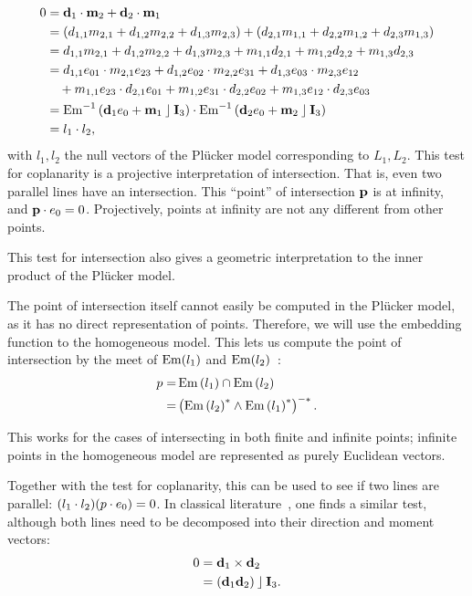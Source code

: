 \begin{align}
  \label{eq:coplanar}
  0 &= \mathbf{d}_1 \mathbin{\cdot} \mathbf{m}_2 + \mathbf{d}_2 \mathbin{\cdot} \mathbf{m}_1 \nonumber \\
    &= \left( d_{1,1} m_{2,1} + d_{1,2} m_{2,2} + d_{1,3} m_{2,3} \right) + \left( d_{2,1} m_{1,1} + d_{2,2} m_{1,2} + d_{2,3} m_{1,3} \right) \nonumber \\
    &= d_{1,1} m_{2,1} + d_{1,2} m_{2,2} + d_{1,3} m_{2,3} + m_{1,1} d_{2,1} + m_{1,2} d_{2,2} + m_{1,3} d_{2,3} \nonumber \\
    &= d_{1,1} e_{01} \mathbin{\cdot} m_{2,1} e_{23} + d_{1,2} e_{02} \mathbin{\cdot} m_{2,2} e_{31} + d_{1,3} e_{03} \mathbin{\cdot} m_{2,3} e_{12} \nonumber \\
    &\quad + m_{1,1} e_{23} \mathbin{\cdot} d_{2,1} e_{01} + m_{1,2} e_{31} \mathbin{\cdot} d_{2,2} e_{02} + m_{1,3} e_{12} \mathbin{\cdot} d_{2,3} e_{03} \nonumber \\
    &= \operatorname{Em}^{-1}\left( \mathbf{d}_1e_0 + \mathbf{m}_1 \mathbin{\rfloor} \mathbf{I}_3 \right) \mathbin{\cdot} \operatorname{Em}^{-1}\left( \mathbf{d}_2e_0 + \mathbf{m}_2 \mathbin{\rfloor} \mathbf{I}_3 \right) \nonumber \\
    &= l_1 \mathbin{\cdot} l_2,
\end{align}
with $l_1, l_2$ the null vectors of the Pl\"ucker model corresponding to $L_1, L_2$.  This test for coplanarity is a projective interpretation of intersection.  That is, even two parallel lines have an intersection.  This ``point'' of intersection $\mathbf{p}$ is at infinity, and $\mathbf{p} \mathbin{\cdot} e_0 = 0$.  Projectively, points at infinity are not any different from other points.

  This test for intersection also gives a geometric interpretation to the inner product of the Pl\"ucker model.

The point of intersection itself cannot easily be computed in the Pl\"ucker model, as it has no direct representation of points.  Therefore, we will use the embedding function to the homogeneous model.  This lets us compute the point of intersection by the meet of $\operatorname{Em}(l_1)$ and $\operatorname{Em}(l_2)$~\cite[Section 11.7.1]{TheBook}:
\begin{align}
  \label{eq:intersect}
  p =& \operatorname{Em}\left(l_1\right) \cap \operatorname{Em}\left(l_2\right) \nonumber \\
  =& \left(\operatorname{Em}\left(l_2\right)^\ast \wedge \operatorname{Em}\left(l_1\right)^\ast\right)^{-\ast} .
\end{align}

This works for the cases of intersecting in both finite and infinite points; infinite points in the homogeneous model are represented as purely Euclidean vectors.

Together with the test for coplanarity, this can be used to see if two lines are parallel: $(l_1 \mathbin{\cdot} l_2) (p \mathbin{\cdot} e_0) = 0$.  In classical literature~\cite{Shoemake}, one finds a similar test, although both lines need to be decomposed into their direction and moment vectors:
\begin{align*}
  0 &= \mathbf{d}_1 \times \mathbf{d}_2 \\
    &= \left( \mathbf{d}_1 \mathbf{d}_2 \right) \mathbin{\rfloor} \mathbf{I}_3 .
\end{align*}
